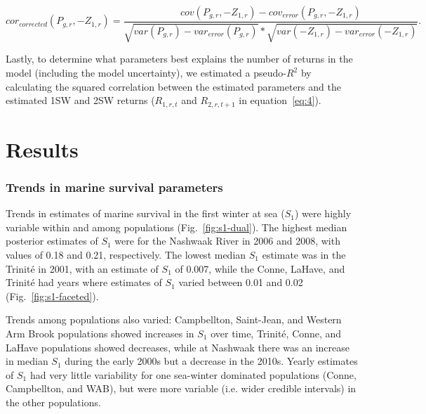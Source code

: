 \documentclass[12pt]{article}
\newcommand{\So}{$S_{1}$\xspace}
\begin{document}
\begin{equation}
cor_{corrected}(P_{g,r},-Z_{1,r}) = \frac{cov(P_{g,r}, -Z_{1,r}) - cov_{error}(P_{g,r}, -Z_{1,r})}
{\sqrt{var(P_{g,r})- var_{error}(P_{g,r})}*\sqrt{var(-Z_{1,r}) - var_{error}(-Z_{1,r})}}\label{eq:corparam}.
\end{equation}

Lastly, to determine what parameters best explains the number of returns in
the model (including the model uncertainty), we estimated a pseudo-$R^2$ by
calculating the squared correlation between the estimated parameters and the
estimated 1SW and 2SW returns ($R_{1,r,t}$ and $R_{2,r,t+1}$ in
equation~\ref{eq:4}).



\section*{Results}


\subsubsection*{Trends in marine survival parameters}

Trends in estimates of marine survival in the first winter at sea (\So) were 
highly variable within and among populations
(Fig.~\ref{fig:s1-dual}). The highest median posterior estimates of \So
were for the Nashwaak River in 2006 and 2008, with values of 0.18 and 0.21,
respectively. The lowest median \So estimate was in the Trinit\'{e} in 2001,
with an estimate of \So of 0.007, while the Conne, LaHave, and Trinit\'{e} had
years where estimates of \So varied between 0.01 and 0.02 (Fig.~\ref{fig:s1-faceted}).

Trends among populations also varied: Campbellton,
Saint-Jean, and Western Arm Brook populations showed increases in \So
over time, Trinit\'{e}, Conne, and LaHave populations showed decreases,
while at Nashwaak there was an increase in median \So during the early
2000s but a decrease in the 2010s. Yearly estimates of \So had very little
variability for one sea-winter dominated populations (Conne, Campbellton, and
WAB), but were more variable (i.e. wider credible intervals) in the other
populations.
\end{document}
